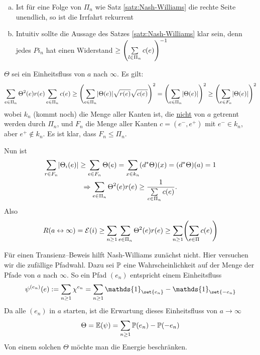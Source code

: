 \begin{bemerkung}
	\begin{enumerate}[a)]
		\item Ist für eine Folge von $\Pi_n$ wie Satz \ref{satz:Nash-Williams} die rechte Seite unendlich, so ist die Irrfahrt rekurrent
		\item Intuitiv sollte die Aussage des Satzes \ref{satz:Nash-Williams} klar sein, denn jedes $Pi_n$ hat einen Widerstand $ \geq \left(\sum\limits_{l\in \Pi_n} c(e)\right)^{-1}$
	\end{enumerate}
\end{bemerkung}
\begin{beweis}
	$\Theta$ sei ein Einheitsfluss von $a$ nach $\infty$. Es gilt:
	\begin{align}
		\sum\limits_{e \in \Pi_n} \Theta^2(e) r(e) \sum\limits_{e \in \Pi_n} c(e) \geq \left(\sum\limits_{e \in \Pi_n}\lvert\Theta(e)\rvert \sqrt{r(e)}\sqrt{c(e)}\right)^2 = \left(\sum\limits_{e \in \Pi_n}\lvert\Theta(e)\rvert\right)^2 \geq \left(\sum\limits_{e \in F_n}\lvert\Theta(e)\rvert \right)^2
	\end{align}
	wobei $k_n$ (kommt noch) die Menge aller Kanten ist, die \underline{nicht} von $a$ getrennt werden durch $\Pi_n$, und $F_n$ die Menge aller Kanten $c = (e^-,e^+)$ mit $e^- \in k_n$, aber $e^+ \notin k_n$. Es ist klar, dass $F_n \leq \Pi_n$.
	
	Nun ist 
	\begin{gather}
		\sum\limits_{r \in F_n} \lvert\Theta_i(e)\rvert \geq \sum\limits_{e \in F_n} \Theta(e) = \sum\limits_{x \in k_n} (d^*\Theta)(x) = (d^*\Theta)(a) = 1 \\
		\Rightarrow \sum\limits_{e \in \Pi_n} \Theta^2(e)r(e) \geq \frac{1}{\sum\limits_{c \in \Pi_n}c(e)}.
	\end{gather}
	Also 
	\begin{align}
		R (a \leftrightarrow \infty) = \mathcal{E}(i) \geq \sum\limits_{n \geq 1}\sum\limits_{e\in \Pi_n} \Theta^2(e)r(e) \geq \sum\limits_{n \geq 1} \enb{\sum\limits_{e \in\Pi} c(e)}
	\end{align}
	
	
\end{beweis}

Für einen Transienz--Beweis hilft Nash-Williams zunächst nicht. Hier versuchen wir die zufällige Pfadwahl. Dazu sei $\mathbb{P}$ eine Wahrscheinlichkeit auf der Menge der Pfade von $a$ nach $\infty$. So ein Pfad $(e_n)$ entspricht einem Einheitsfluss
\begin{gather}
	\psi^{(e_n)} (e) := \sum\limits_{n \geq 1} \chi^{e_n} = \sum\limits_{n \geq 1} \mathds{1}_{\set{e_n}}- \mathds{1}_{\set{-e_n}}
\end{gather}
Da alle $(e_n)$ in $a$ starten, ist die Erwartung dieses Einheitsfluss von $a \to \infty$  
\begin{align}
	\Theta = \EW{\psi} = \sum\limits_{n \geq 1}\prop{e_n} - \prop{-e_n}
\end{align}
Von einem solchen $\Theta$ möchte man die Energie beschränken. 

